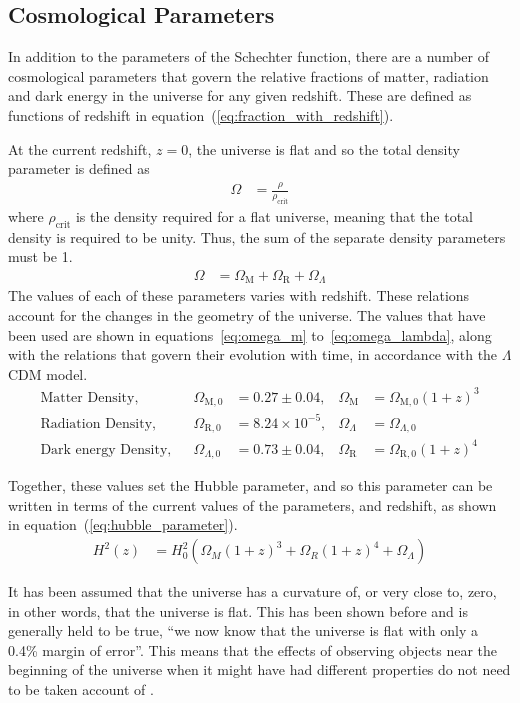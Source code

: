 	\subsection{Cosmological Parameters} %
	\label{ssub:cosmological_parameters}
		In addition to the parameters of the Schechter function, there are a number of cosmological parameters that govern the relative fractions of matter, radiation and dark energy in the universe for any given redshift. These are defined as functions of redshift in equation~(\ref{eq:fraction_with_redshift}).

		At the current redshift, $z=0$, the universe is flat and so the total density parameter is defined as
		\begin{align}
			\Omega &= \frac{\rho}{\rho_{\text{crit}}}
		\end{align}
		where $\rho_{\text{crit}}$ is the density required for a flat universe, meaning that the total density is required to be unity. Thus, the sum of the separate density parameters must be 1.
		\begin{align}
			\Omega &= \Omega_\text{M} + \Omega_\text{R} + \Omega_\Lambda \label{eq:fraction_with_redshift}
		\end{align}
		The values of each of these parameters varies with redshift. These relations account for the changes in the geometry of the universe. The values that have been used are shown in equations~\ref{eq:omega_m} to~\ref{eq:omega_lambda}, along with the relations that govern their evolution with time, in accordance with the $\Lambda$CDM model\cite{modern_astrophysics_bradley}.
		\begin{align}
			\text{Matter Density}, 		&& \Omega_{\text{M},0} 	&= 0.27\pm 0.04,			& \Omega_\text{M} &= \Omega_{\text{M},0}{(1+z)}^3 \label{eq:omega_m}\\
			\text{Radiation Density}, 	&& \Omega_{\text{R},0}	&= 8.24\times 10^{-5}, 	& \Omega_\Lambda  &= \Omega_{\Lambda,0} \label{eq:omega_r}\\
			\text{Dark energy Density}, 	&& \Omega_{\Lambda,0} 	&= 0.73\pm 0.04,			& \Omega_\text{R} &= \Omega_{\text{R},0}{(1+z)}^4 \label{eq:omega_lambda}
		\end{align}

		Together, these values set the Hubble parameter, and so this parameter can be written in terms of the current values of the parameters, and redshift, as shown in equation~(\ref{eq:hubble_parameter})\cite{hubble_parameter_astro_journal}.
		\begin{align}
	        H^2(z) &= H_0^2\left( \Omega_M {(1+z)}^3 + \Omega_R {(1+z)}^4 + \Omega_{\Lambda} \right) \label{eq:hubble_parameter}
    	\end{align}

    	It has been assumed that the universe has a curvature of, or very close to, zero\cite{1102.4485}, in other words, that the universe is flat. This has been shown before and is generally held to be true, ``we now know that the universe is flat with only a 0.4\% margin of error''\cite{nasa_uni_shape}. This means that the effects of observing objects near the beginning of the universe when it might have had different properties do not need to be taken account of .
